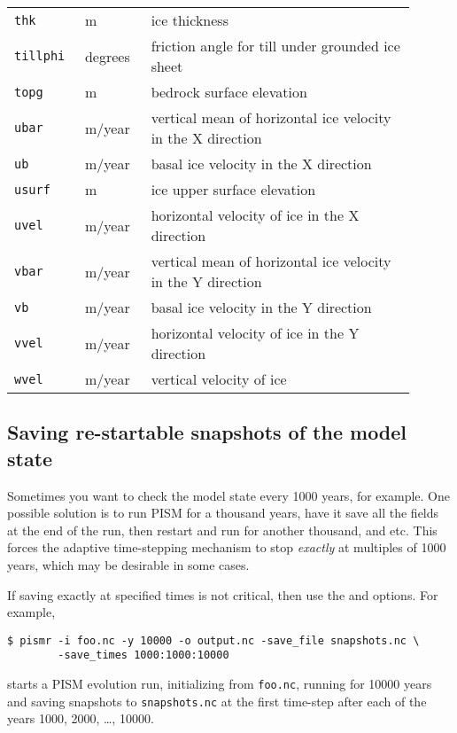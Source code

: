 \begin{table}[h]
\begin{longtable}{p{0.15\linewidth}p{0.15\linewidth}p{0.6\linewidth}}
    \texttt{thk} & m & ice thickness\\
    \texttt{tillphi} & degrees & friction angle for till under grounded ice sheet \\
    \texttt{topg} & m & bedrock surface elevation \\
    \texttt{ubar} & m/year & vertical mean of horizontal ice velocity in the X direction \\
    \texttt{ub} & m/year & basal ice velocity in the X direction \\
    \texttt{usurf} & m & ice upper surface elevation \\
    \texttt{uvel} & m/year & horizontal velocity of ice in the X direction \\
    \texttt{vbar} & m/year & vertical mean of horizontal ice velocity in the Y direction \\
    \texttt{vb} & m/year & basal ice velocity in the Y direction \\
    \texttt{vvel} & m/year & horizontal velocity of ice in the Y direction \\
    \texttt{wvel} & m/year & vertical velocity of ice \\
    \hline
  \end{longtable}
 \label{tab:extra-vars}
\end{table}
\subsection{Saving re-startable snapshots of the model state}
\label{sec:snapshots}  Sometimes you want to check the model state every 1000 years, for example.  One possible solution is to run PISM for a thousand years, have it save all the fields at the end of the run, then restart and run for another thousand, and etc.  This forces the adaptive time-stepping mechanism to stop \emph{exactly} at multiples of 1000 years, which may be desirable in some cases.

If saving exactly at specified times is not critical, then use the  and  options.  For example,
\begin{verbatim}
$ pismr -i foo.nc -y 10000 -o output.nc -save_file snapshots.nc \
        -save_times 1000:1000:10000
\end{verbatim}
starts a PISM evolution run, initializing from \verb|foo.nc|, running for
10000 years and saving snapshots to \verb|snapshots.nc| at the first time-step
after each of the years 1000, 2000, \dots, 10000.

